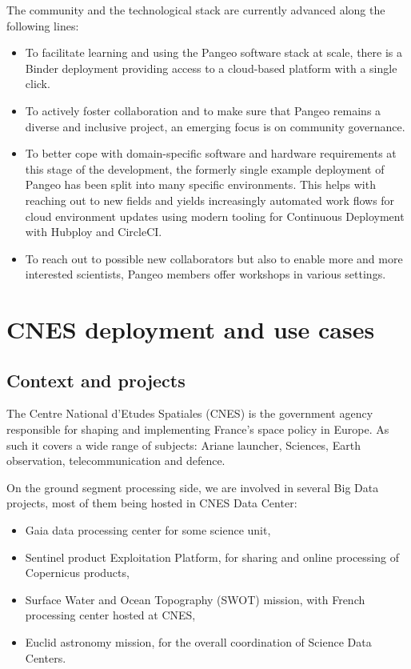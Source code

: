 \documentclass{article}
\begin{document}
The community and the technological stack are currently advanced along the
following lines:
\begin{itemize}
\item To facilitate learning and using the Pangeo software stack at scale, there is a Binder deployment\cite{b8} providing access to a cloud-based platform with a single click.
\item To actively foster collaboration and to make sure that Pangeo remains a diverse and inclusive project, an emerging focus is on community governance.
\item To better cope with domain-specific software and hardware requirements at this stage of the development, the formerly single example deployment of Pangeo has been split into many specific environments.  This helps with reaching out to new fields and yields increasingly automated work flows for cloud environment updates using modern tooling for Continuous Deployment with Hubploy and CircleCI.
\item To reach out to possible new collaborators but also to enable more and more interested scientists, Pangeo members offer workshops in various settings.
\end{itemize}

\section{CNES deployment and use cases}
\label{sec:cnes}

\subsection{Context and projects}
\label{ssec:context}

The Centre National d'Etudes Spatiales (CNES) is the government agency responsible for shaping and implementing France's space policy in Europe. As such it covers a wide range of subjects: Ariane launcher, Sciences, Earth observation, telecommunication and defence.

On the ground segment processing side, we are involved in several Big Data projects, most of them being hosted in CNES Data Center:
\begin{itemize}
\item Gaia data processing center for some science unit,
\item Sentinel product Exploitation Platform, for sharing and online processing of Copernicus products,
\item Surface Water and Ocean Topography (SWOT) mission, with French processing center hosted at CNES,
\item Euclid astronomy mission, for the overall coordination of Science Data Centers.
\end{itemize}
\end{document}
